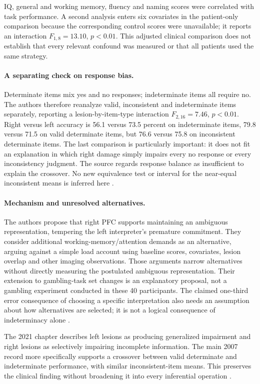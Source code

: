 IQ, general and working memory, fluency and naming scores were correlated
with task performance. A second analysis enters six covariates in the
patient-only comparison because the corresponding control scores were
unavailable; it reports an interaction \(F_{1,8}=13.10\), \(p<0.01\).
This adjusted clinical comparison does not establish that every relevant
confound was measured or that all patients used the same strategy.

\paragraph{A separating check on response bias.}
Determinate items mix yes and no responses; indeterminate items all
require no. The authors therefore reanalyze valid, inconsistent and
indeterminate items separately, reporting a lesion-by-item-type
interaction \(F_{2,16}=7.46\), \(p<0.01\). Right versus left accuracy is
56.1 versus 73.5 percent on indeterminate items, 79.8 versus 71.5 on
valid determinate items, but 76.6 versus 75.8 on inconsistent determinate
items. The last comparison is particularly important: it does not fit
an explanation in which right damage simply impairs every no response
or every inconsistency judgment. The source regards response balance
as insufficient to explain the crossover. No new equivalence test or
interval for the near-equal inconsistent means is inferred here
\cite[p.~2248]{GoelEtAl2007CertainUncertain}.

\paragraph{Mechanism and unresolved alternatives.}
The authors propose that right PFC supports maintaining an ambiguous
representation, tempering the left interpreter's premature commitment.
They consider additional working-memory/attention demands as an
alternative, arguing against a simple load account using baseline
scores, covariates, lesion overlap and other imaging observations.
Those arguments narrow alternatives without directly measuring the
postulated ambiguous representation. Their extension to gambling-task
set changes is an explanatory proposal, not a gambling experiment
conducted in these 40 participants. The claimed one-third error
consequence of choosing a specific interpretation also needs an
assumption about how alternatives are selected; it is not a logical
consequence of indeterminacy alone
\cite[pp.~2248--2249]{GoelEtAl2007CertainUncertain}.

The 2021 chapter describes left lesions as producing generalized
impairment and right lesions as selectively impairing incomplete
information. The main 2007 record more specifically supports a
crossover between valid determinate and indeterminate performance,
with similar inconsistent-item means. This preserves the clinical
finding without broadening it into every inferential operation
\cite[p.~122]{Goel2021RationalityBrain}.

